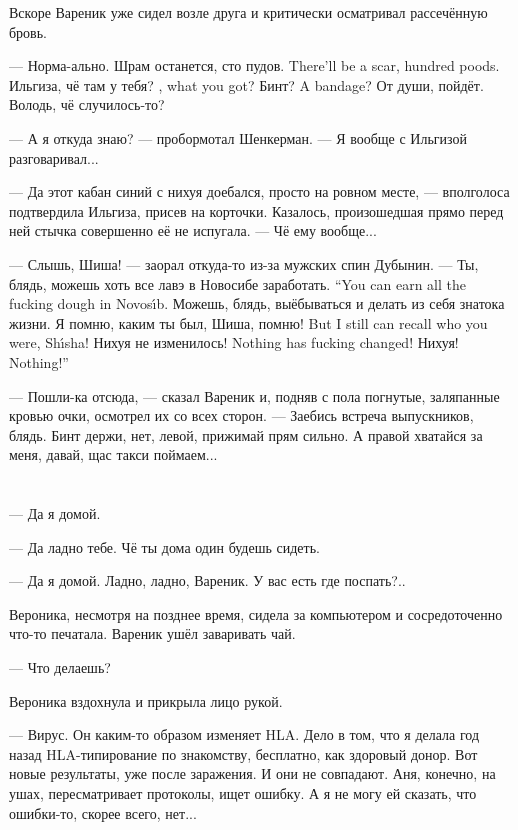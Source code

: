 Вскоре Вареник уже сидел возле друга и критически осматривал рассечённую бровь.

--- Норма-ально.
{Шрам останется, сто пудов.}
{There'll be a scar, hundred poods.}
{Ильгиза, чё там у тебя?}
{\Ilgiza, what you got?}
{Бинт?}
{A bandage?}
От души, пойдёт.
Володь, чё случилось-то?

--- А я откуда знаю? --- пробормотал Шенкерман.
--- Я вообще с Ильгизой разговаривал...

--- Да этот кабан синий с нихуя доебался, просто на ровном месте, --- вполголоса подтвердила Ильгиза, присев на корточки.
Казалось, произошедшая прямо перед ней стычка совершенно её не испугала.
--- Чё ему вообще...

--- Слышь, Шиша! --- заорал откуда-то из-за мужских спин Дубынин.
{--- Ты, блядь, можешь хоть все лавэ в Новосибе заработать.}
{``You can earn all the fucking dough in Novos\'{\i}b.}
Можешь, блядь, выёбываться и делать из себя знатока жизни.
{Я помню, каким ты был, Шиша, помню!}
{But I still can recall who you were, Sh\'{\i}sha!}
{Нихуя не изменилось!}
{Nothing has fucking changed!}
{Нихуя!}
{Nothing!''}

--- Пошли-ка отсюда, --- сказал Вареник и, подняв с пола погнутые, заляпанные кровью очки, осмотрел их со всех сторон.
--- Заебись встреча выпускников, блядь.
Бинт держи, нет, левой, прижимай прям сильно.
А правой хватайся за меня, давай, щас такси поймаем...

\chapter{}

--- Да я домой.

--- Да ладно тебе.
Чё ты дома один будешь сидеть.

--- Да я домой.
Ладно, ладно, Вареник.
У вас есть где поспать?..

Вероника, несмотря на позднее время, сидела за компьютером и сосредоточенно что-то печатала.
Вареник ушёл заваривать чай.

--- Что делаешь?

Вероника вздохнула и прикрыла лицо рукой.

--- Вирус.
Он каким-то образом изменяет HLA.
Дело в том, что я делала год назад HLA-типирование по знакомству, бесплатно, как здоровый донор.
Вот новые результаты, уже после заражения.
И они не совпадают.
Аня, конечно, на ушах, пересматривает протоколы, ищет ошибку.
А я не могу ей сказать, что ошибки-то, скорее всего, нет...


